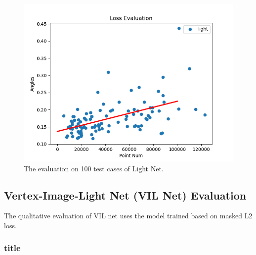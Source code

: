 \documentclass[border=15pt, multi, tikz]{article}
\begin{document}
\begin{figure}[th]
	\centering
	\includegraphics[width=0.5\linewidth]{./Figures/scatter-light-noised.png}
	\caption{The evaluation on 100 test cases of Light Net.}
	\label{fig:scatter-light}
\end{figure}



\subsection{Vertex-Image-Light Net (VIL Net) Evaluation}


The qualitative evaluation of VIL net uses the model trained based on masked L2 loss.

\subsubsection{title}
\end{document}
